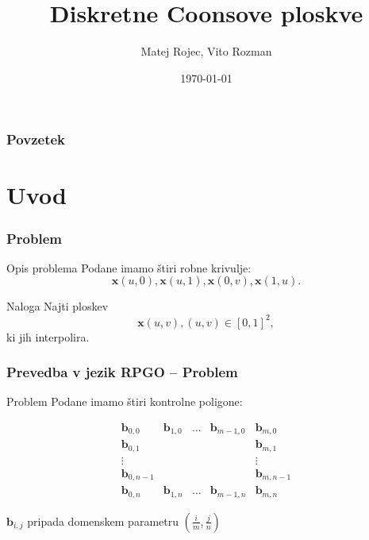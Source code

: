 \documentclass{beamer}
\begin{document}

\title{Diskretne Coonsove ploskve}
\author{Matej Rojec, Vito Rozman}
\date{\today}

\begin{frame}
   \titlepage
\end{frame}






\begin{frame}
\frametitle{Povzetek}
   \tableofcontents
\end{frame}



\section{Uvod}


\begin{frame}
\frametitle{Problem}
\begin{block}{Opis problema}
Podane imamo štiri robne krivulje: 
$$\mathbf{x}(u,0), \mathbf{x}(u,1), \mathbf{x}(0,v),  \mathbf{x}(1,u).$$
\end{block}

\begin{block}{Naloga}
Najti ploskev
$$\mathbf{x}(u,v), (u,v) \in [0,1]^2,$$ 
ki jih interpolira.
\end{block}

\end{frame}


\begin{frame}
    \frametitle{Prevedba v jezik RPGO -- Problem}
    \begin{block}{Problem}
    Podane imamo štiri kontrolne poligone: 
    
    $$
    \begin{matrix}
       \mathbf{b}_{0,0}  &\mathbf{b}_{1,0} & \ldots &\mathbf{b}_{m-1,0} &\mathbf{b}_{m,0} \\
       \mathbf{b}_{0,1}  &                 &        &                   &\mathbf{b}_{m,1} \\
       \vdots            &                 &        &                   &  \vdots\\
       \mathbf{b}_{0,n-1} &                &        &                    &\mathbf{b}_{m,n-1} \\ 
       \mathbf{b}_{0,n}  &\mathbf{b}_{1,n} & \ldots &\mathbf{b}_{m-1,n} &\mathbf{b}_{m,n} 
    \end{matrix}
    $$
          
\end{block}
    
\begin{block}{}
    $\mathbf{b}_{i,j}$ pripada domenskem parametru $\left( \frac{i}{m}, \frac{j}{n}  \right)$          
\end{block}


\end{frame}
\end{document}
